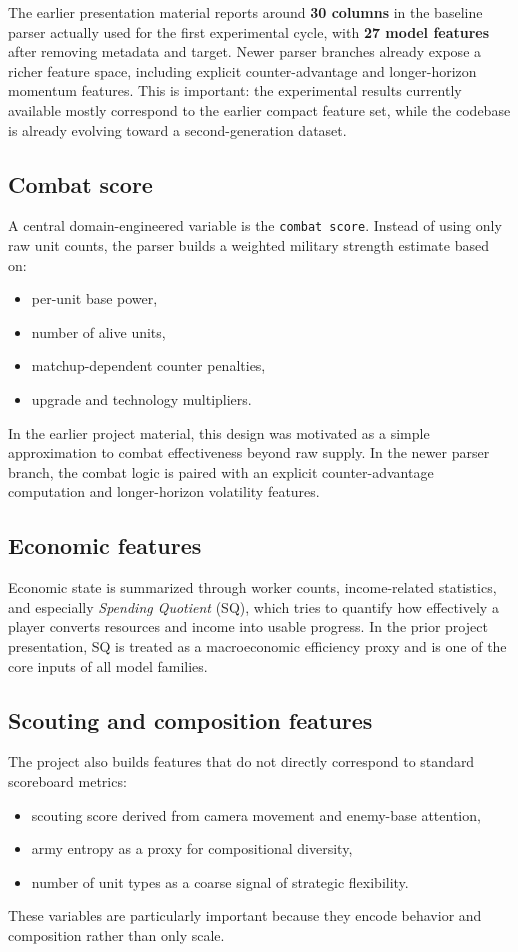 \documentclass[11pt,a4paper]{article}
\begin{document}
	The earlier presentation material reports around \textbf{30 columns} in the baseline parser actually used for the first experimental cycle, with \textbf{27 model features} after removing metadata and target. Newer parser branches already expose a richer feature space, including explicit counter-advantage and longer-horizon momentum features. This is important: the experimental results currently available mostly correspond to the earlier compact feature set, while the codebase is already evolving toward a second-generation dataset.
	
	\subsection{Combat score}
	A central domain-engineered variable is the \texttt{combat score}. Instead of using only raw unit counts, the parser builds a weighted military strength estimate based on:
	\begin{itemize}
		\item per-unit base power,
		\item number of alive units,
		\item matchup-dependent counter penalties,
		\item upgrade and technology multipliers.
	\end{itemize}
	In the earlier project material, this design was motivated as a simple approximation to combat effectiveness beyond raw supply. In the newer parser branch, the combat logic is paired with an explicit counter-advantage computation and longer-horizon volatility features.
	
	\subsection{Economic features}
	Economic state is summarized through worker counts, income-related statistics, and especially \emph{Spending Quotient} (SQ), which tries to quantify how effectively a player converts resources and income into usable progress. In the prior project presentation, SQ is treated as a macroeconomic efficiency proxy and is one of the core inputs of all model families.
	
	\subsection{Scouting and composition features}
	The project also builds features that do not directly correspond to standard scoreboard metrics:
	\begin{itemize}
		\item scouting score derived from camera movement and enemy-base attention,
		\item army entropy as a proxy for compositional diversity,
		\item number of unit types as a coarse signal of strategic flexibility.
	\end{itemize}
	These variables are particularly important because they encode behavior and composition rather than only scale.
	
\end{document}
